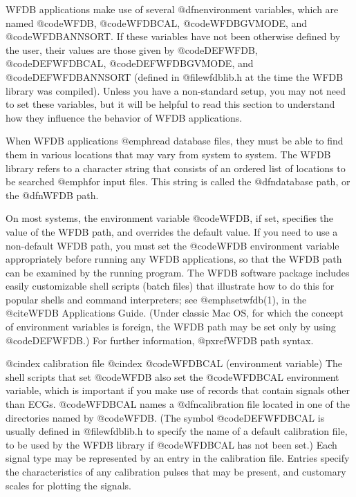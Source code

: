{WFDB applications make use of several @dfn{environment variables}, which are
named @code{WFDB}, @code{WFDBCAL}, @code{WFDBGVMODE}, and @code{WFDBANNSORT}.
If these variables have not been otherwise defined by the user, their values
are those given by @code{DEFWFDB}, @code{DEFWFDBCAL}, @code{DEFWFDBGVMODE},
and @code{DEFWFDBANNSORT} (defined in @file{wfdblib.h} at the
time the WFDB library was compiled).  Unless you have a non-standard
setup, you may not need to set these variables, but it will be helpful
to read this section to understand how they influence the behavior of
WFDB applications.

When WFDB applications @emph{read} database files, they must be able to
find them in various locations that may vary from system to system.  The
WFDB library refers to a character string that consists of an ordered
list of locations to be searched @emph{for input files}.  This string is
called the @dfn{database path}, or the @dfn{WFDB path}.

On most systems, the environment variable @code{WFDB}, if set, specifies
the value of the WFDB path, and overrides the default value.  If you
need to use a non-default WFDB path, you must set the @code{WFDB}
environment variable appropriately before running any WFDB applications,
so that the WFDB path can be examined by the running program.  The WFDB
software package includes easily customizable shell scripts (batch
files) that illustrate how to do this for popular shells and command
interpreters; see @emph{setwfdb}(1), in the @cite{WFDB Applications
Guide}.  (Under classic Mac OS, for which the concept of environment
variables is foreign, the WFDB path may be set only by using
@code{DEFWFDB}.)  For further information, @pxref{WFDB path syntax}.

@cindex calibration file
@cindex @code{WFDBCAL} (environment variable)
The shell scripts that set @code{WFDB} also set the @code{WFDBCAL}
environment variable, which is important if you make use of records that
contain signals other than ECGs.  @code{WFDBCAL} names a
@dfn{calibration file} located in one of the directories named by
@code{WFDB}.  (The symbol @code{DEFWFDBCAL} is usually defined in
@file{wfdblib.h} to specify the name of a default calibration file, to
be used by the WFDB library if @code{WFDBCAL} has not been set.)  Each
signal type may be represented by an entry in the calibration file.
Entries specify the characteristics of any calibration pulses that may
be present, and customary scales for plotting the signals.

}
